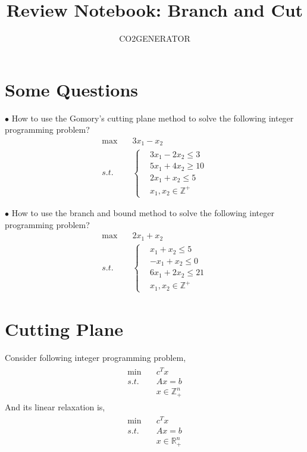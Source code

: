 \documentclass{article}
\title {Review Notebook: Branch and Cut}
\author{CO2GENERATOR}
\begin{document}
\maketitle 
\allowdisplaybreaks[4]

\section{Some Questions}

\noindent $\bullet$ How to use the Gomory's cutting plane method to solve the following integer programming problem?
\begin{align}
	\max \quad & 3x_1 - x_2 \\
	s.t. \quad & \left\{
	\begin{aligned}
		& 3x_1 - 2x_2 \leq 3 \\
		& 5x_1 + 4x_2 \geq 10 \\
		& 2x_1 + x_2 \leq 5 \\
		& x_1, x_2 \in \mathbb{Z}^+
	\end{aligned}\right.
\end{align}

\noindent $\bullet$ How to use the branch and bound method to solve the following integer programming problem?
\begin{align}
	\max \quad & 2x_1 + x_2 \\
	s.t. \quad & \left\{
	\begin{aligned}
		& x_1 + x_2 \leq 5 \\
		& -x_1 + x_2 \leq 0 \\
		& 6x_1 + 2x_2 \leq 21 \\
		& x_1, x_2 \in \mathbb{Z}^+
	\end{aligned}\right.
\end{align}

\section{Cutting Plane}

Consider following integer programming problem,
\begin{align}
\label{problem:ip}
\begin{aligned}
\min \quad & c^Tx \\
s.t. \quad & Ax = b \\
& x \in \mathbb{Z}_+^n
\end{aligned}
\end{align}
And its linear relaxation is,
\begin{align}
\label{linear-relaxation}
\begin{aligned}
\min \quad & c^Tx \\
s.t. \quad & Ax = b \\
& x \in \mathbb{R}_+^n
\end{aligned}
\end{align}
\end{document}
